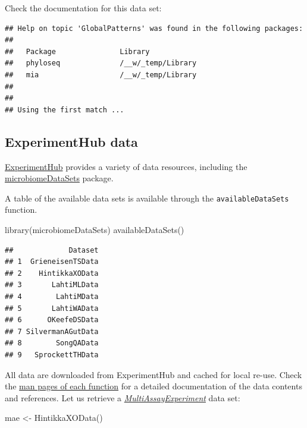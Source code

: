 \documentclass[
]{book}
\newenvironment{Shaded}{\begin{snugshade}}{\end{snugshade}}
\newcommand{\FunctionTok}[1]{\textcolor[rgb]{0.00,0.00,0.00}{#1}}
\newcommand{\NormalTok}[1]{#1}
\newcommand{\OtherTok}[1]{\textcolor[rgb]{0.56,0.35,0.01}{#1}}
\begin{document}
Check the documentation for this data set:

\begin{verbatim}
## Help on topic 'GlobalPatterns' was found in the following packages:
## 
##   Package               Library
##   phyloseq              /__w/_temp/Library
##   mia                   /__w/_temp/Library
## 
## 
## Using the first match ...
\end{verbatim}

\hypertarget{experimenthub-data}{%
\subsection{ExperimentHub data}\label{experimenthub-data}}

\href{https://bioconductor.org/packages/release/bioc/vignettes/ExperimentHub/inst/doc/ExperimentHub.html}{ExperimentHub}
provides a variety of data resources, including the
\href{https://bioconductor.org/packages/devel/data/experiment/html/microbiomeDataSets.html}{microbiomeDataSets}
package.

A table of the available data sets is available through the \texttt{availableDataSets}
function.

\begin{Shaded}
\begin{Highlighting}[]
\FunctionTok{library}\NormalTok{(microbiomeDataSets)}
\FunctionTok{availableDataSets}\NormalTok{()}
\end{Highlighting}
\end{Shaded}

\begin{verbatim}
##             Dataset
## 1  GrieneisenTSData
## 2    HintikkaXOData
## 3       LahtiMLData
## 4        LahtiMData
## 5       LahtiWAData
## 6      OKeefeDSData
## 7 SilvermanAGutData
## 8        SongQAData
## 9   SprockettTHData
\end{verbatim}

All data are downloaded from ExperimentHub and cached for local
re-use. Check the \href{https://microbiome.github.io/microbiomeDataSets/reference/index.html}{man pages of each
function}
for a detailed documentation of the data contents and references. Let
us retrieve a \emph{\href{https://bioconductor.org/packages/3.14/MultiAssayExperiment}{MultiAssayExperiment}} data set:

\begin{Shaded}
\begin{Highlighting}[]
\NormalTok{mae }\OtherTok{\textless{}{-}} \FunctionTok{HintikkaXOData}\NormalTok{()}
\end{Highlighting}
\end{Shaded}
\end{document}
